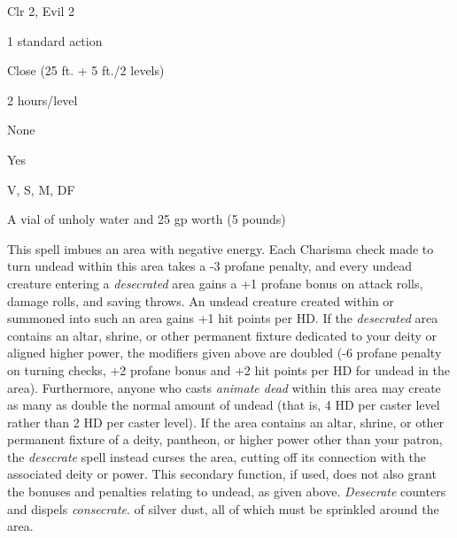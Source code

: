 
\begin{description*}
\item[Level:] Clr 2, Evil 2
\item[Casting Time:] 1 standard action
\item[Range:] Close (25 ft. + 5 ft./2 levels)
\item[Duration:] 2 hours/level
\item[Saving Throw:] None
\item[Spell Resistance:] Yes
\item[Components:] V, S, M, DF
\item[Arcane Material Component:] A vial of unholy water and 25 gp worth (5 pounds)
\end{description*}

This spell imbues an area with negative energy. Each Charisma check made to turn
undead within this area takes a -3 profane penalty, and every undead creature entering
a \textit{desecrated} area gains a +1 profane bonus on attack rolls, damage rolls,
and saving throws. An undead creature created within or summoned into such an area
gains +1 hit points per HD.
If the \textit{desecrated} area contains an altar, shrine, or other permanent fixture
dedicated to your deity or aligned higher power, the modifiers given above are
doubled (-6 profane penalty on turning checks, +2 profane bonus and +2 hit points
per HD for undead in the area).
Furthermore, anyone who casts \textit{animate dead} within this area may create
as many as double the normal amount of undead (that is, 4 HD per caster level rather
than 2 HD per caster level).
If the area contains an altar, shrine, or other permanent fixture of a deity, pantheon,
or higher power other than your patron, the \textit{desecrate} spell instead curses
the area, cutting off its connection with the associated deity or power. This secondary
function, if used, does not also grant the bonuses and penalties relating to undead,
as given above.
\textit{Desecrate} counters and dispels \textit{consecrate}.
of silver dust, all of which must be sprinkled around the area.